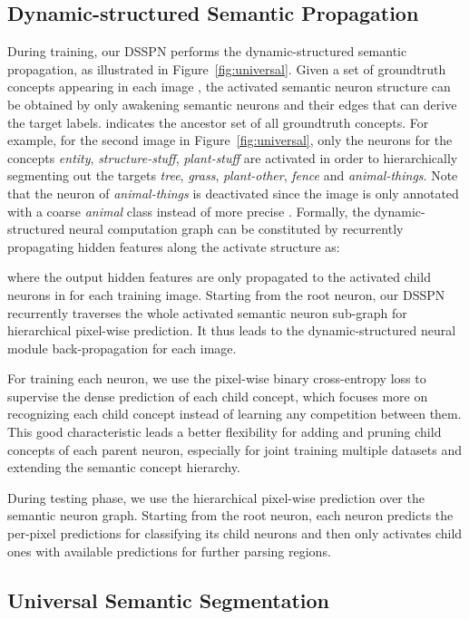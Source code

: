 \documentclass[10pt,twocolumn,letterpaper]{article}
\begin{document}
\subsection{Dynamic-structured Semantic Propagation}
\label{sec:dynamic}
During training, our DSSPN performs the dynamic-structured semantic propagation, as illustrated in Figure~\ref{fig:universal}. Given a set of groundtruth concepts  appearing in each image , the activated semantic neuron structure  can be obtained by only awakening semantic neurons  and their edges that can derive the target labels.  indicates the ancestor set of all groundtruth concepts. For example, for the second image in Figure~\ref{fig:universal}, only the neurons for the concepts \emph{entity}, \emph{structure-stuff}, \emph{plant-stuff} are activated in order to hierarchically segmenting out the targets \emph{tree}, \emph{grass}, \emph{plant-other}, \emph{fence} and \emph{animal-things}. Note that the neuron of \emph{animal-things} is deactivated since the image is only annotated with a coarse \emph{animal} class instead of more precise . Formally, the dynamic-structured neural computation graph can be constituted by recurrently propagating hidden features along the activate structure as:

where the output hidden features  are only propagated to the activated child neurons in  for each training image. Starting from the root neuron, our DSSPN recurrently traverses the whole activated semantic neuron sub-graph for hierarchical pixel-wise prediction. It thus leads to the dynamic-structured neural module back-propagation for each image. 

For training each neuron, we use the pixel-wise binary cross-entropy loss to supervise the dense prediction of each child concept, which focuses more on recognizing each child concept instead of learning any competition between them. This good characteristic leads a better flexibility for adding and pruning child concepts of each parent neuron, especially for joint training multiple datasets and extending the semantic concept hierarchy.

During testing phase, we use the hierarchical pixel-wise prediction over the semantic neuron graph. Starting from the root neuron, each neuron predicts the per-pixel predictions for classifying its child neurons and then only activates child ones with available predictions for further parsing regions.

\subsection{Universal Semantic Segmentation}
\end{document}
